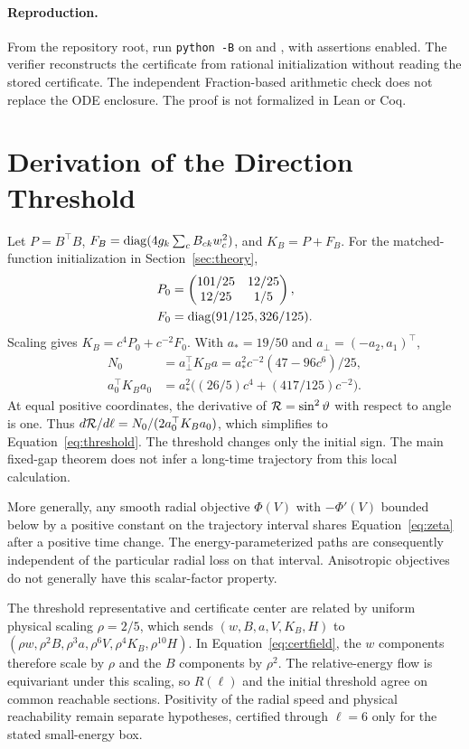 \paragraph{Reproduction.}
From the repository root, run \texttt{python -B} on  and , with assertions enabled. The verifier reconstructs the certificate from rational initialization without reading the stored certificate. The independent Fraction-based arithmetic check does not replace the ODE enclosure. The proof is not formalized in Lean or Coq.

\section{Derivation of the Direction Threshold}
Let $P=B^\top B$, $F_B=\operatorname{diag}(4g_k\sum_cB_{ck}w_c^2)$, and $K_B=P+F_B$. For the matched-function initialization in Section~\ref{sec:theory},
\begin{align}
P_0&=\begin{pmatrix}101/25&12/25\\12/25&1/5\end{pmatrix},\nonumber\\
F_0&=\operatorname{diag}(91/125,326/125).
\end{align}
Scaling gives $K_B=c^4P_0+c^{-2}F_0$. With $a_*=19/50$ and $a_\perp=(-a_2,a_1)^\top$,
\begin{align}
N_0&=a_\perp^\top K_Ba=a_*^2c^{-2}(47-96c^6)/25,\\
a_0^\top K_Ba_0&=a_*^2\big((26/5)c^4+(417/125)c^{-2}\big).
\end{align}
At equal positive coordinates, the derivative of $\mathcal R=\sin^2\vartheta$ with respect to angle is one. Thus $d\mathcal R/d\ell=N_0/(2a_0^\top K_Ba_0)$, which simplifies to Equation~\eqref{eq:threshold}. The threshold changes only the initial sign. The main fixed-gap theorem does not infer a long-time trajectory from this local calculation.

More generally, any smooth radial objective $\Phi(V)$ with $-\Phi'(V)$ bounded below by a positive constant on the trajectory interval shares Equation~\eqref{eq:zeta} after a positive time change. The energy-parameterized paths are consequently independent of the particular radial loss on that interval. Anisotropic objectives do not generally have this scalar-factor property.

The threshold representative and certificate center are related by uniform physical scaling $\rho=2/5$, which sends $(w,B,a,V,K_B,H)$ to $(\rho w,\rho^2B,\rho^3a,\rho^6V,\rho^4K_B,\rho^{10}H)$. In Equation~\eqref{eq:certfield}, the $w$ components therefore scale by $\rho$ and the $B$ components by $\rho^2$. The relative-energy flow is equivariant under this scaling, so $R(\ell)$ and the initial threshold agree on common reachable sections. Positivity of the radial speed and physical reachability remain separate hypotheses, certified through $\ell=6$ only for the stated small-energy box.

